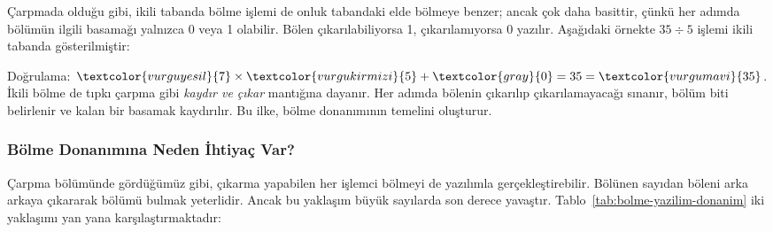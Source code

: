 Çarpmada olduğu gibi, ikili tabanda bölme işlemi de onluk tabandaki elde bölmeye benzer; ancak çok daha basittir, çünkü her adımda bölümün ilgili basamağı yalnızca 0 veya 1 olabilir. Bölen çıkarılabiliyorsa 1, çıkarılamıyorsa 0 yazılır. Aşağıdaki örnekte $35 \div 5$ işlemi ikili tabanda gösterilmiştir:

\begin{center}
\end{center}

Doğrulama: $\textcolor{vurguyesil}{7} \times \textcolor{vurgukirmizi}{5} + \textcolor{gray}{0} = 35 = \textcolor{vurgumavi}{35}$\;\checkmark. İkili bölme de tıpkı çarpma gibi \emph{kaydır ve çıkar} mantığına dayanır. Her adımda bölenin çıkarılıp çıkarılamayacağı sınanır, bölüm biti belirlenir ve kalan bir basamak kaydırılır. Bu ilke, bölme donanımının temelini oluşturur.

\subsubsection*{Bölme Donanımına Neden İhtiyaç Var?}

Çarpma bölümünde gördüğümüz gibi, çıkarma yapabilen her işlemci bölmeyi de yazılımla gerçekleştirebilir. Bölünen sayıdan böleni arka arkaya çıkararak bölümü bulmak yeterlidir. Ancak bu yaklaşım büyük sayılarda son derece yavaştır. Tablo~\ref{tab:bolme-yazilim-donanim} iki yaklaşımı yan yana karşılaştırmaktadır:

